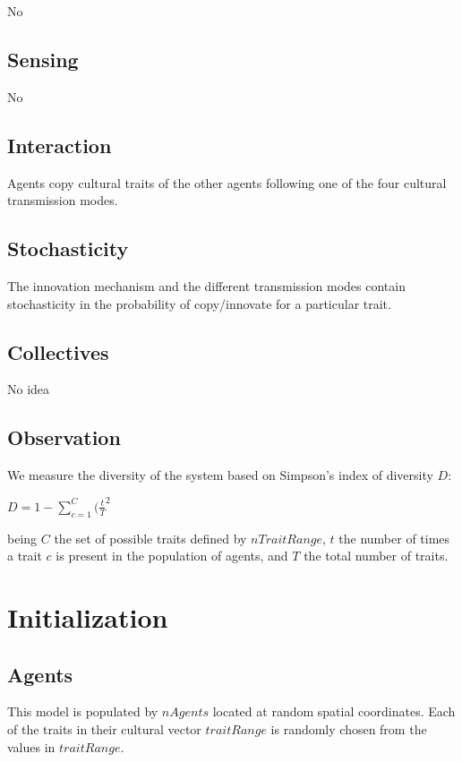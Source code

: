 \documentclass[11pt,a4paper,twocolumn,notitlepage]{article}
\begin{document}
No

\subsection{Sensing}

No

\subsection{Interaction}

Agents copy cultural traits of the other agents following one of the four cultural transmission modes. 

\subsection{Stochasticity}

The innovation mechanism and the different transmission modes contain stochasticity in the probability of copy/innovate for a particular trait. 

\subsection{Collectives}

No idea

\subsection{Observation}

We measure the diversity of the system based on Simpson's index of diversity $D$:

$D = 1 - \sum\limits_{c=1}^C{(\frac{t}{T}^2}$

being $C$ the set of possible traits defined by $nTraitRange$, $t$ the number of times a trait $c$ is present in the population of agents, and $T$ the total number of traits.

\section{Initialization}

\subsection{Agents}

This model is populated by $nAgents$ located at random spatial coordinates. Each of the traits in their cultural vector $traitRange$ is randomly chosen from the values in $traitRange$.
\end{document}
